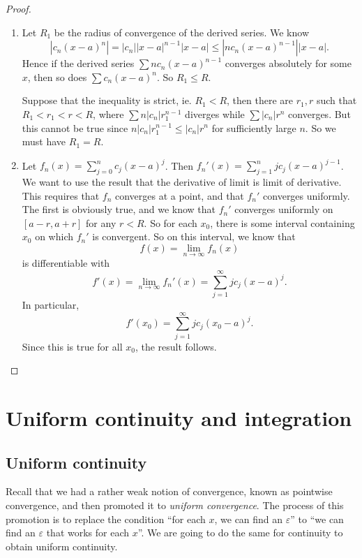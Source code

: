 \documentclass[a4paper]{article}
\begin{document}
\begin{proof}\leavevmode
  \begin{enumerate}
    \item Let $R_1$ be the radius of convergence of the derived series. We know
      \[
        |c_n(x - a)^n| = |c_n||x - a|^{n - 1}|x - a| \leq |n c_n (x - a)^{n - 1}| |x - a|.
      \]
      Hence if the derived series $\sum n c_n(x - a)^{n - 1}$ converges absolutely for some $x$, then so does $\sum c_n (x - a)^n$. So $R_1 \leq R$.

      Suppose that the inequality is strict, ie. $R_1 < R$, then there are $r_1, r$ such that $R_1 < r_1 < r < R$, where $\sum n|c_n| r_1^{n - 1}$ diverges while $\sum |c_n| r^n$ converges. But this cannot be true since $n|c_n| r_1^{n - 1} \leq |c_n| r^n$ for sufficiently large $n$. So we must have $R_1 = R$.

    \item Let $f_n(x) = \sum\limits_{j = 0}^n c_j (x - a)^j$. Then $f_n '(x) = \sum\limits_{j = 1}^n j c_j (x - a)^{j - 1}$. We want to use the result that the derivative of limit is limit of derivative. This requires that $f_n$ converges at a point, and that $f_n'$ converges uniformly. The first is obviously true, and we know that $f_n'$ converges uniformly on $[a - r, a + r]$ for any $r < R$. So for each $x_0$, there is some interval containing $x_0$ on which $f_n'$ is convergent. So on this interval, we know that
      \[
        f(x) = \lim_{n \to \infty}f_n (x)
      \]
      is differentiable with
      \[
        f'(x) = \lim_{n \to \infty}f_n'(x) = \sum_{j = 1}^\infty jc_j (x - a)^j.
      \]
      In particular,
      \[
        f'(x_0) = \sum_{j = 1}^\infty jc_j (x_0 - a)^j.
      \]
      Since this is true for all $x_0$, the result follows.
  \end{enumerate}
\end{proof}

\section{Uniform continuity and integration}
\subsection{Uniform continuity}
Recall that we had a rather weak notion of convergence, known as pointwise convergence, and then promoted it to \emph{uniform convergence}. The process of this promotion is to replace the condition ``for each $x$, we can find an $\varepsilon$'' to ``we can find an $\varepsilon$ that works for each $x$''. We are going to do the same for continuity to obtain uniform continuity.
\end{document}
